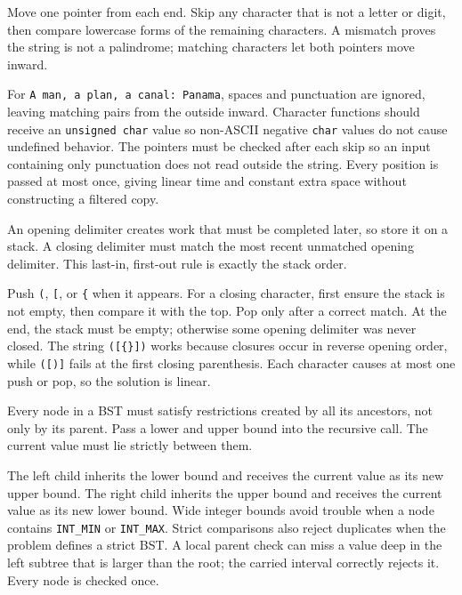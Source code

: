 \expandafter\def\csname sourcewalkthrough@65\endcsname{%
Move one pointer from each end. Skip any character that is not a letter or
digit, then compare lowercase forms of the remaining characters. A mismatch
proves the string is not a palindrome; matching characters let both pointers
move inward.

For \texttt{A man, a plan, a canal: Panama}, spaces and punctuation are
ignored, leaving matching pairs from the outside inward. Character functions
should receive an \texttt{unsigned char} value so non-ASCII negative
\texttt{char} values do not cause undefined behavior. The pointers must be
checked after each skip so an input containing only punctuation does not read
outside the string. Every position is passed at most once, giving linear time
and constant extra space without constructing a filtered copy.}

\expandafter\def\csname sourcewalkthrough@66\endcsname{%
An opening delimiter creates work that must be completed later, so store it on
a stack. A closing delimiter must match the most recent unmatched opening
delimiter. This last-in, first-out rule is exactly the stack order.

Push \texttt{(}, \texttt{[}, or \texttt{\{} when it appears. For a closing
character, first ensure the stack is not empty, then compare it with the top.
Pop only after a correct match. At the end, the stack must be empty; otherwise
some opening delimiter was never closed. The string \texttt{([\{\}])} works
because closures occur in reverse opening order, while \texttt{([)]} fails at
the first closing parenthesis. Each character causes at most one push or pop,
so the solution is linear.}

\expandafter\def\csname sourcewalkthrough@67\endcsname{%
Every node in a BST must satisfy restrictions created by all its ancestors,
not only by its parent. Pass a lower and upper bound into the recursive call.
The current value must lie strictly between them.

The left child inherits the lower bound and receives the current value as its
new upper bound. The right child inherits the upper bound and receives the
current value as its new lower bound. Wide integer bounds avoid trouble when a
node contains \texttt{INT\_MIN} or \texttt{INT\_MAX}. Strict comparisons also
reject duplicates when the problem defines a strict BST. A local parent check
can miss a value deep in the left subtree that is larger than the root; the
carried interval correctly rejects it. Every node is checked once.}

